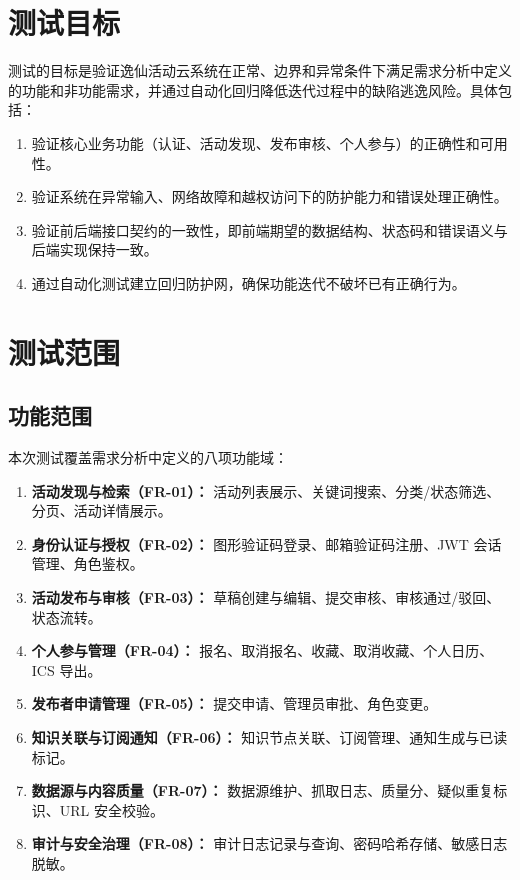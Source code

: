 \documentclass[12pt,a4paper]{ctexart}
\begin{document}
\tableofcontents\clearpage{}

\section{测试目标}
测试的目标是验证逸仙活动云系统在正常、边界和异常条件下满足需求分析中定义的功能和非功能需求，并通过自动化回归降低迭代过程中的缺陷逃逸风险。具体包括：
\begin{enumerate}
\item 验证核心业务功能（认证、活动发现、发布审核、个人参与）的正确性和可用性。
\item 验证系统在异常输入、网络故障和越权访问下的防护能力和错误处理正确性。
\item 验证前后端接口契约的一致性，即前端期望的数据结构、状态码和错误语义与后端实现保持一致。
\item 通过自动化测试建立回归防护网，确保功能迭代不破坏已有正确行为。
\end{enumerate}

\section{测试范围}
\subsection{功能范围}
本次测试覆盖需求分析中定义的八项功能域：
\begin{enumerate}
\item \textbf{活动发现与检索（FR-01）：} 活动列表展示、关键词搜索、分类/状态筛选、分页、活动详情展示。
\item \textbf{身份认证与授权（FR-02）：} 图形验证码登录、邮箱验证码注册、JWT 会话管理、角色鉴权。
\item \textbf{活动发布与审核（FR-03）：} 草稿创建与编辑、提交审核、审核通过/驳回、状态流转。
\item \textbf{个人参与管理（FR-04）：} 报名、取消报名、收藏、取消收藏、个人日历、ICS 导出。
\item \textbf{发布者申请管理（FR-05）：} 提交申请、管理员审批、角色变更。
\item \textbf{知识关联与订阅通知（FR-06）：} 知识节点关联、订阅管理、通知生成与已读标记。
\item \textbf{数据源与内容质量（FR-07）：} 数据源维护、抓取日志、质量分、疑似重复标识、URL 安全校验。
\item \textbf{审计与安全治理（FR-08）：} 审计日志记录与查询、密码哈希存储、敏感日志脱敏。
\end{enumerate}
\end{document}
